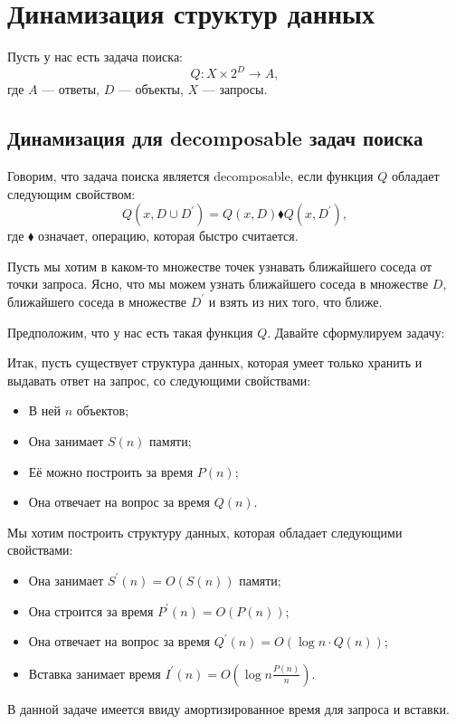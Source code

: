 \section{Динамизация структур данных} 

Пусть у нас есть задача поиска:
$$Q:X\times2^D\to A,$$
где $A$ — ответы, $D$ — объекты, $X$ — запросы.

\subsection{Динамизация для decomposable задач поиска}

\begin{definition}
Говорим, что задача поиска является decomposable, если функция $Q$ обладает следующим свойством:
$$Q(x,D\cup D^\prime)=Q(x,D)\blacklozenge  Q(x,D^\prime),$$
где $\blacklozenge$ означает, операцию, которая быстро считается.
\end{definition}

\begin{exmpl}
Пусть мы хотим в каком-то множестве точек узнавать ближайшего соседа от точки запроса. Ясно, что мы можем узнать ближайшего соседа в множестве $D$, ближайшего соседа в множестве $D^\prime$ и взять из них того, что ближе.
\end{exmpl}

Предположим, что у нас есть такая функция $Q$. Давайте сформулируем задачу:

Итак, пусть существует структура данных, которая умеет только хранить и выдавать ответ на запрос, со следующими свойствами:
\begin{itemize}
    \item В ней $n$ объектов;
    \item Она занимает $S(n)$ памяти;
    \item Её можно построить за время $P(n)$;
    \item Она отвечает на вопрос за время $Q(n)$.
\end{itemize}

\begin{task}
Мы хотим построить структуру данных, которая обладает следующими свойствами:
\begin{itemize}
    \item Она занимает $S^\prime(n)=O(S(n))$ памяти;

    \item Она строится за время $P^\prime(n)=O(P(n))$;

    \item Она отвечает на вопрос за время $Q^\prime(n)=O(\log n\cdot Q(n))$;

    \item Вставка занимает время $I^\prime(n)=O\left(\log n\frac{P(n)}{n}\right)$.

\end{itemize}

В данной задаче имеется ввиду амортизированное время для запроса и вставки.
\end{task}

